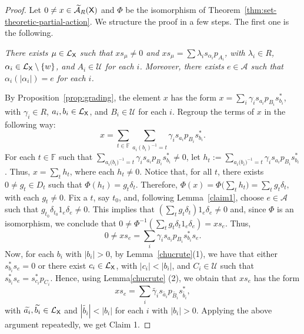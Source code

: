 \documentclass[a4paper,12pt]{amsart}
\theoremstyle{definition}
\theoremstyle{remark}
\numberwithin{equation}{section}
\newcommand{\osf}{{\normalfont \textsf{X}}}
\newcommand{\lang}{\CL_{\osf}}
\newcommand{\ualgshift}{\TCA_R(\osf)}
\newcommand{\alf}{\mathscr{A}}
\newcommand{\F}{\mathbb{F}}
\newcommand{\CA}{\mathcal{A}}
\newcommand{\CL}{\mathcal{L}}
\newcommand{\TCA}{\widetilde{\CA}}
\newcommand{\TCB}{\mathcal{U}}
\begin{document}
\begin{proof} 

Let $0\neq x\in \ualgshift$ and $\Phi$ be the isomorphism of Theorem~\ref{thm:set-theoretic-partial-action}.
We structure the proof in a few steps. The first one is the following.







\vspace{0.5pc}
 {\it There exists  $\mu\in \lang$ such that $xs_\mu\neq 0$ and $x s_\mu=\sum\limits\lambda_i s_{\alpha_i}p_{A_i}$, with $\lambda_i\in R$, $\alpha_i \in \lang\setminus \{w\}$, and $A_i\in \TCB$ for each $i$. Moreover, there exists $e\in \alf$ such that ${\alpha_i}(|\alpha_i|)=e$ for each $i$.}
\smallskip

By Proposition~\ref{prop:grading}, the element $x$ has the form $x=\sum\limits_i\gamma_i s_{a_i}p_{B_i}s_{b_i}^*$, with $\gamma_i\in R$, $a_i,b_i\in \lang$, and $B_i\in \TCB$ for each $i$. Regroup the terms of $x$ in the following way:
$$x=\sum\limits_{t\in \F}\sum\limits_{a_i{(b_i)}^{-1}=t}\gamma_i s_{a_i}p_{B_i}s_{b_i}^*.$$ For each $t\in \F$ such that $\sum\limits_{a_i{(b_i})^{-1}=t}\gamma_i s_{a_i}p_{B_i}s_{b_i}^*\neq 0$, let $h_t:=\sum\limits_{a_i{(b_i})^{-1}=t}\gamma_i s_{a_i}p_{B_i}s_{b_i}^*$. Thus, $x=\sum\limits_{t}h_t$, where each $h_t\neq 0$.  Notice that, for all $t$, there exists $0\neq g_t\in D_t$ such that $\Phi(h_t)=g_t\delta_t$. Therefore, 
$\Phi(x)=\Phi\big(\sum\limits_t h_t\big)=\sum\limits_t g_t\delta_t,$ with each $g_t\neq 0$. Fix a $t$, say $t_0$, and, following Lemma~\ref{claim1}, choose $e\in \alf$ such that $g_{t_0}\delta_{t_0} 1_e\delta_e\neq 0$. This implies that $\left(\sum_t g_t \delta_t \right) 1_e \delta_e \neq 0$ and, since $\Phi$ is an isomorphism, we conclude that $0\neq \Phi^{-1}(\sum_t g_t\delta_t 1_e\delta_e)=xs_e$.
Thus, $$0\neq xs_e=\sum_i \gamma_i s_{a_i}p_{B_i}s_{b_i}^*s_e.$$ Now, for each $b_i$ with $|b_i|>0$, by Lemma~\ref{chucrute}(1), we have that either $s_{b_i}^*s_e=0$ or there exist $c_i\in \lang$, with $|c_i|< |b_i|$, and $C_i\in \TCB$ such that $s_{b_i}^*s_e=s_{c_i}^*p_{C_i}$. Hence, using Lemma\ref{chucrute} (2), we obtain that $xs_e$ has the form
$$xs_e=\sum\limits_i {\widetilde{\gamma_i}}s_{\widetilde{a_i}}p_{\widetilde{B_i}}s_{\widetilde{b_i}}^*,$$
 with $\widetilde{a_i}, \widetilde{b_i}\in \lang$ and 
 $|\widetilde{b_i}|<|b_i|$ for each $i$ with $|b_i|>0$. Applying the above argument repeatedly, we get Claim 1.


\end{proof}
\end{document}
